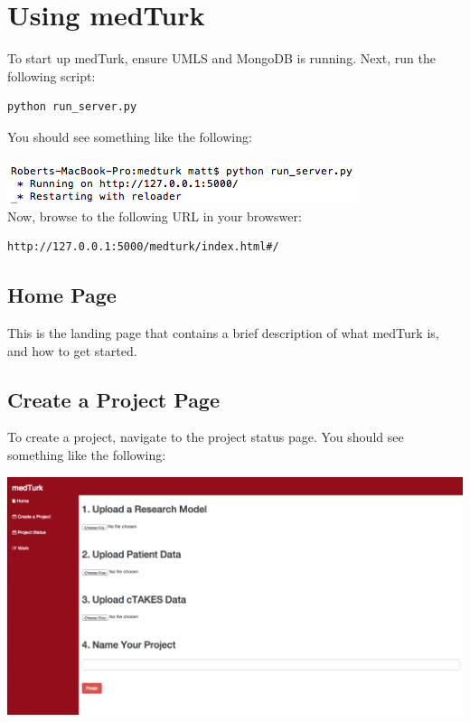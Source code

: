 \documentclass{book}
\begin{document}
\section{Using medTurk}
To start up medTurk, ensure UMLS and MongoDB is running. Next, run the following script:

\begin{verbatim}
python run_server.py
\end{verbatim}
You should see something like the following:
\\
\\
\includegraphics[scale=0.8]{run_server.png}~  \\[1cm]
Now, browse to the following URL in your browswer:

\begin{verbatim}
http://127.0.0.1:5000/medturk/index.html#/
\end{verbatim}

\subsection*{Home Page}
This is the landing page that contains a brief description of what medTurk is, and how to get started.

\subsection*{Create a Project Page}
To create a project, navigate to the project status page. You should see something like the following:

\includegraphics[scale=0.3]{create.png}~  \\[1cm]
\end{document}

